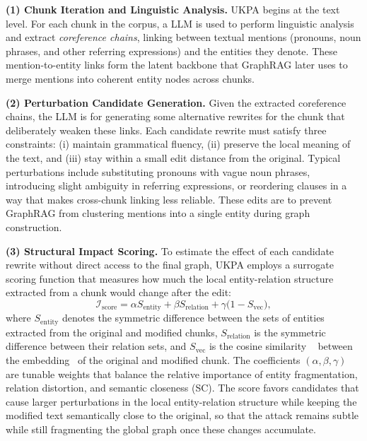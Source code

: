 \documentclass[letterpaper]{article} %
\begin{document}
\textbf{(1) Chunk Iteration and Linguistic Analysis.}
UKPA begins at the text level. 
For each chunk in the corpus, a LLM is used to perform
linguistic analysis and extract \emph{coreference chains}, linking between textual
mentions (pronouns, noun phrases, and other referring expressions) and the entities they denote.
These mention-to-entity links form the latent backbone that GraphRAG later uses
to merge mentions into coherent entity nodes across chunks.


\textbf{(2) Perturbation Candidate Generation.}
Given the extracted coreference chains, the LLM is for generating some alternative rewrites for the chunk that deliberately weaken these links.
Each candidate rewrite must satisfy three constraints:
(i) maintain grammatical fluency,
(ii) preserve the local meaning of the text, and
(iii) stay within a small edit distance from the original.
Typical perturbations include substituting pronouns with vague noun phrases,
introducing slight ambiguity in referring expressions, or reordering clauses in a way
that makes cross-chunk linking less reliable.
These edits are to prevent GraphRAG from clustering mentions into a single entity
during graph construction.

\textbf{(3) Structural Impact Scoring.}
To estimate the effect of each candidate rewrite without direct access to the final graph,
UKPA employs a surrogate scoring function that measures how much the local entity-relation
structure extracted from a chunk would change after the edit:
\begin{equation}
    \mathcal{I}_\mathrm{score} = \alpha S_\mathrm{entity} + \beta S_\mathrm{relation} + \gamma \bigl(1 - S_\mathrm{vec}\bigr),
\end{equation}
where \(S_\mathrm{entity}\) denotes the symmetric difference between the sets of entities
extracted from the original and modified chunks, 
\(S_\mathrm{relation}\) is the symmetric difference between their relation sets,
and \(S_\mathrm{vec}\) is the cosine similarity ~\cite{DBLP:conf/naacl/LeeHZ18,DBLP:journals/eswa/RahimAAAK25} between the embedding~\cite{DBLP:journals/jmlr/BengioDVJ03} of the original and modified chunk.
The coefficients $(\alpha,\beta,\gamma)$ are tunable weights that balance the relative importance of entity fragmentation, relation distortion, and semantic closeness (SC).
The score favors candidates that cause larger perturbations in the local entity-relation structure
while keeping the modified text semantically close to the original,
so that the attack remains subtle while still fragmenting the global graph once these changes accumulate.
\end{document}
